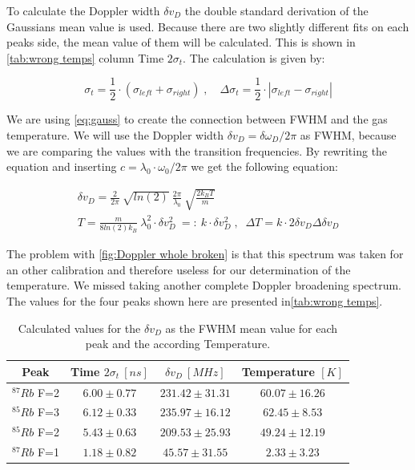 \documentclass[]{article}
\begin{document}
To calculate the Doppler width $\delta v_D$ the double standard derivation of the Gaussians mean value is used. Because there are two slightly different fits on each peaks side, the mean value of them will be calculated. This is shown in \autoref{tab:wrong temps} column Time $2\sigma_t$. The calculation is given by:

\begin{equation}
\sigma_t = \frac{1}{2}\cdot(\sigma_{left} + \sigma_{right}) \;,\quad \Delta\sigma_t = \frac{1}{2} \cdot |\sigma_{left} - \sigma_{right}|
\end{equation}

We are using \autoref{eq:gauss} to create the connection between FWHM and the gas temperature. We will use the Doppler width $\delta v_D = \delta \omega_D /2\pi$ as FWHM, because we are comparing the values with the transition frequencies. By rewriting the equation and inserting $c=\lambda_0 \cdot \omega_0 /2\pi$ we get the following equation:

\begin{gather}
\delta v_D = \frac{2}{2\pi}\ \sqrt{ln(2)}\  \frac{2\pi}{\lambda_0}\ \sqrt{\frac{2k_BT}{m}} \\
T = \frac{m}{8ln(2)k_B}\ \lambda_0^2 \cdot \delta v_D^2\ =:\ k \cdot\delta v_D^2 \;,\;\; \Delta T = k \cdot 2\delta v_D \Delta\delta v_D
\end{gather}

The problem with \autoref{fig:Doppler whole broken} is that this spectrum was taken for an other calibration and therefore useless for our determination of the temperature. We missed taking another complete Doppler broadening spectrum.
The values for the four peaks shown here are presented in\autoref{tab:wrong temps}.

\begin{table}[H]
\centering
\begin{tabular}{|c|c|c|c|}
\hline
Peak & Time $2\sigma_t\ [ns]$ & $\delta v_D\ [MHz]$ & Temperature $[K]$ \\ \hline\hline
$^{87}Rb$ F=2 & $6.00 \pm 0.77$  & $231.42 \pm 31.31$  & $60.07 \pm 16.26$  \\ \hline
$^{85}Rb$ F=3 & $6.12 \pm 0.33$  & $235.97 \pm 16.12$  & $62.45 \pm 8.53$  \\ \hline
$^{85}Rb$ F=2 & $5.43 \pm 0.63$  & $209.53 \pm 25.93$  & $49.24 \pm 12.19$  \\ \hline
$^{87}Rb$ F=1 & $1.18 \pm 0.82$  & $45.57 \pm 31.55$  & $2.33 \pm 3.23$  \\ \hline
\hline
\end{tabular}
\caption{Calculated values for the $\delta v_D$ as the FWHM mean value for each peak and the according Temperature.}
\label{tab:wrong temps}
\end{table}
\end{document}
